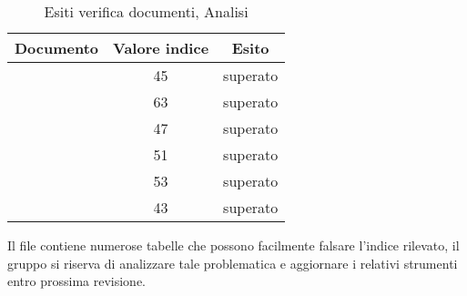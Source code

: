 	\begin{table}[h]
	\centering
	\begin{tabular}{ | c | c | c | }
    \hline
    Documento & Valore indice & Esito \\ \hline
    \AnalisiDeiRequisiti{} & 45 &  superato \\ \hline
    \Glossario{} & 63 &  superato \\ \hline
    \NormeDiProgetto{} & 47 &  superato \\ \hline
    \PianoDiProgetto{} & 51 &  superato \\ \hline
    \PianoDiQualifica{} & 53 &  superato \\ \hline
    \StudioDiFattibilita{} & 43 &  superato \\ \hline
    \end{tabular}
	\caption{Esiti verifica documenti, Analisi}
	\end{table}
	
	Il file \AnalisiDeiRequisiti{} contiene numerose tabelle che possono facilmente falsare l'indice rilevato, il gruppo si riserva di analizzare tale problematica e aggiornare i relativi strumenti entro prossima revisione.
	

	 	
	 	
	 
	 


	

